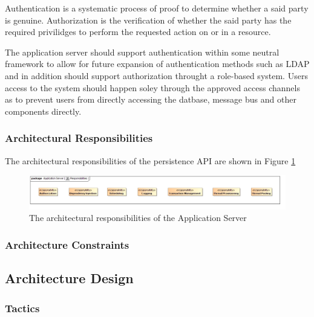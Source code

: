 Authentication is a systematic process of proof to determine whether a said
party is genuine.  Authorization is the verification of whether the said party
has the required privilidges to perform the requested action on or in a resource.

The application server should support authentication within some neutral framework
to allow for future expansion of authentication methods such as LDAP and in addition
should support authorization throught a role-based system. Users access to the
system should happen soley through the approved access channels as to prevent users
from directly accessing the datbase, message bus and other components directly.


\subsubsection{Architectural Responsibilities}
The architectural responsibilities of the persistence API are shown in
Figure \ref{fig:applicationServerResponsibilities}
\begin{figure}[H]
	\begin{center}
	\includegraphics[scale=0.4]{../Diagrams and Charts/Application Server/Responsibilities.jpg}
	\caption{The architectural responsibilities of the Application Server}
	\label{fig:applicationServerResponsibilities}
	\end{center}
\end{figure}

\subsubsection{Architecture Constraints}
\subsection{Architecture Design}
\subsubsection{Tactics}
